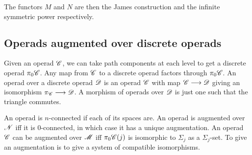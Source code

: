 \documentclass[11pt]{article}
\begin{document}
The functors $M$ and $N$ are then the James construction and the infinite 
symmetric power respectively.
\subsection{Operads augmented over discrete operads}
Given an operad $\mathscr{C}$, we can take path components at each level to get a
discrete operad $\pi_0\mathscr{C}$. Any map from $\mathscr{C}$ to a discrete operad factors
through $\pi_0\mathscr{C}$. An operad over a discrete operad $\mathscr{D}$ is an operad
$\mathscr{C}$ with map $\mathscr{C}\longrightarrow\mathscr{D}$ giving an isomorphism $\pi_{\mathscr{C}}\longrightarrow\mathscr{D}$.
A morphism of operads over $\mathscr{D}$ is just one such that the triangle commutes.

An operad is $n$-connected if each of its spaces are. An operad is augmented over
$\mathscr{N}$ iff it is $0$-connected, in which case it has a unique augmentation.
An operad $\mathscr{C}$ can be augmented over $\mathscr{M}$ iff $\pi_0\mathscr{C}(j)$ is isomorphic
to $\Sigma_j$ as a $\Sigma_j$-set. To give an augmentation is to give a system
of compatible isomorphisms.
\end{document}
